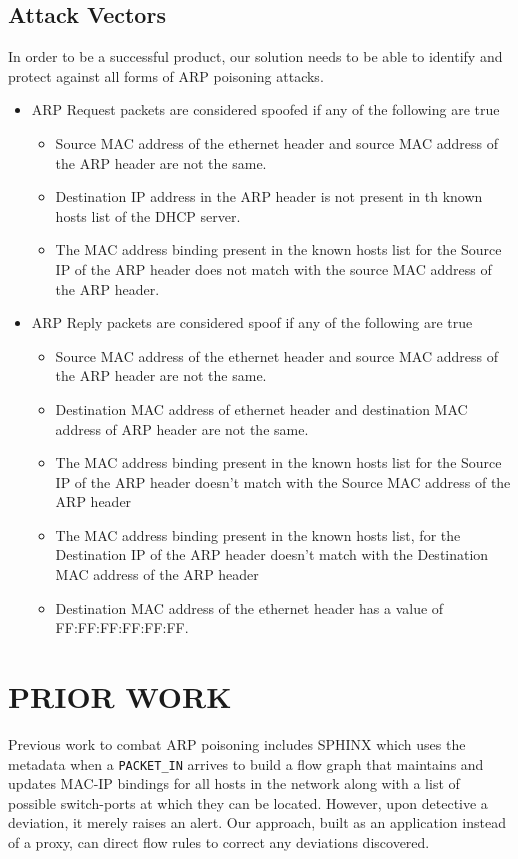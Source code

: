 \documentclass[conference]{IEEEtran}
\begin{document}
\subsection{Attack Vectors}
In order to be a successful product, our solution needs to be able to identify and protect against all forms of ARP poisoning attacks.
\begin{itemize}
    \item ARP Request packets are considered spoofed if any of the following are true
    \begin{itemize}
        \item Source MAC address of the ethernet header and source MAC address of the ARP header are not the same.
        \item Destination IP address in the ARP header is not present in th known hosts list of the DHCP server.
        \item The MAC address binding present in the known hosts list for the Source IP of the ARP header does not match with the source MAC address of the ARP header.
    \end{itemize}
    \item ARP Reply packets are considered spoof if any of the following are true
    \begin{itemize}
        \item Source MAC address of the ethernet header and source MAC address of the ARP header are not the same.
        \item Destination MAC address of ethernet header and destination MAC address of ARP header are not the same.
        \item The MAC address binding present in the known hosts list for the Source IP of the ARP header doesn't match with the Source MAC address of the ARP header
        \item The MAC address binding present in the known hosts list, for the Destination IP of the ARP header doesn't match with the Destination MAC address of the ARP header
        \item Destination MAC address of the ethernet header has a value of FF:FF:FF:FF:FF:FF.
    \end{itemize}
\end{itemize}
 
\section{PRIOR WORK}
Previous work to combat ARP poisoning includes SPHINX\cite{b1} which uses the metadata when a \texttt{PACKET\_IN} arrives to build a flow graph that maintains and updates MAC-IP bindings for all hosts in the network along with a list of possible switch-ports at which they can be located. However, upon detective a deviation, it merely raises an alert. Our approach, built as an application instead of a proxy, can direct flow rules to correct any deviations discovered.
\end{document}
